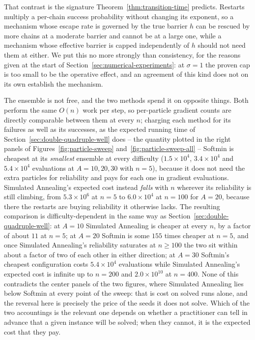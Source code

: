 \documentclass{article}
\theoremstyle{plain}
\theoremstyle{definition}
\theoremstyle{remark}
\begin{document}
That contrast is the signature Theorem~\ref{thm:transition-time} predicts. Restarts multiply a
per-chain success probability without changing its exponent, so a mechanism whose escape rate is
governed by the true barrier $h$ can be rescued by more chains at a moderate barrier and cannot be
at a large one, while a mechanism whose effective barrier is capped independently of $h$ should not
need them at either. We put this no more strongly than consistency, for the reasons given at the start of Section~\ref{sec:numerical-experiments}: at $\sigma=1$ the proven cap is too small to be the operative effect, and an
agreement of this kind does not on its own establish the mechanism.

The ensemble is not free, and the two methods spend it on opposite things. Both perform the same
$O(n)$ work per step, so per-particle gradient counts are directly comparable between them at
every $n$; charging each method for its failures as well as its successes, as the expected running
time of Section~\ref{sec:double-quadruple-well} does -- the quantity plotted in the right panels of
Figures~\ref{fig:particle-sweep} and~\ref{fig:particle-sweep-all} -- Softmin is cheapest at its \emph{smallest}
ensemble at every difficulty ($1.5\times10^4$, $3.4\times10^4$ and $5.4\times10^4$ evaluations at
$A=10,20,30$ with $n=5$), because it does not need the extra particles for reliability and pays for
each one in gradient evaluations. Simulated Annealing's expected cost instead \emph{falls} with $n$
wherever its reliability is still climbing, from $5.3\times10^6$ at $n=5$ to $6.0\times10^4$ at
$n=100$ for $A=20$, because there the restarts are buying reliability it otherwise lacks. The
resulting comparison is difficulty-dependent in the same way as Section~\ref{sec:double-quadruple-well}:
at $A=10$ Simulated Annealing is cheaper at every $n$, by a factor of about $11$ at $n=5$; at
$A=20$ Softmin is some $155$ times cheaper at $n=5$, and once Simulated Annealing's reliability
saturates at $n\geq100$ the two sit within about a factor of two of each other in either direction;
at $A=30$ Softmin's cheapest configuration costs $5.4\times10^4$ evaluations while Simulated
Annealing's expected cost is infinite up to $n=200$ and $2.0\times10^{10}$ at $n=400$. None of this
contradicts the center panels of the two figures, where Simulated Annealing lies below Softmin at
every point of the sweep: that is cost on solved runs alone, and the reversal here is precisely the
price of the seeds it does not solve. Which of the two accountings is the relevant one depends on
whether a practitioner can tell in advance that a given instance will be solved; when they cannot,
it is the expected cost that they pay.
\end{document}
